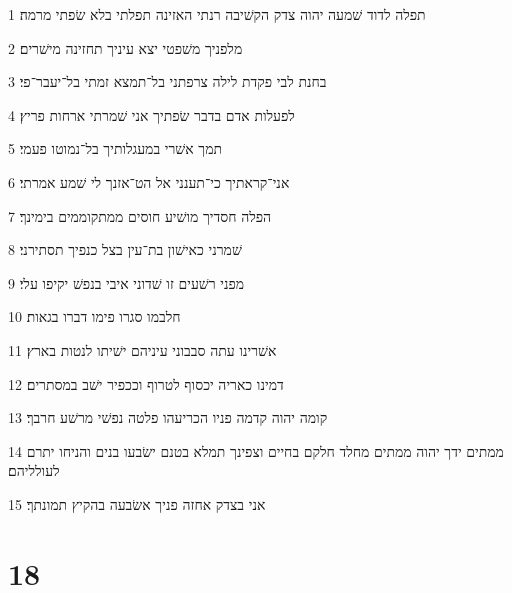 \par 1 תפלה לדוד שׁמעה יהוה צדק הקשׁיבה רנתי האזינה תפלתי בלא שׂפתי מרמה׃
\par 2 מלפניך משׁפטי יצא עיניך תחזינה מישׁרים׃
\par 3 בחנת לבי פקדת לילה צרפתני בל־תמצא זמתי בל־יעבר־פי׃
\par 4 לפעלות אדם בדבר שׂפתיך אני שׁמרתי ארחות פריץ׃
\par 5 תמך אשׁרי במעגלותיך בל־נמוטו פעמי׃
\par 6 אני־קראתיך כי־תענני אל הט־אזנך לי שׁמע אמרתי׃
\par 7 הפלה חסדיך מושׁיע חוסים ממתקוממים בימינך׃
\par 8 שׁמרני כאישׁון בת־עין בצל כנפיך תסתירני׃
\par 9 מפני רשׁעים זו שׁדוני איבי בנפשׁ יקיפו עלי׃
\par 10 חלבמו סגרו פימו דברו בגאות׃
\par 11 אשׁרינו עתה סבבוני עיניהם ישׁיתו לנטות בארץ׃
\par 12 דמינו כאריה יכסוף לטרוף וככפיר ישׁב במסתרים׃
\par 13 קומה יהוה קדמה פניו הכריעהו פלטה נפשׁי מרשׁע חרבך׃
\par 14 ממתים ידך יהוה ממתים מחלד חלקם בחיים וצפינך תמלא בטנם ישׂבעו בנים והניחו יתרם לעולליהם׃
\par 15 אני בצדק אחזה פניך אשׂבעה בהקיץ תמונתך׃

\chapter{18}

